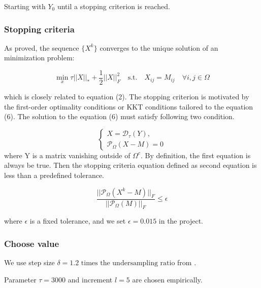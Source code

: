 \documentclass[letter,10pt]{article}
\begin{document}
Starting with $Y_0$ until a stopping criterion is reached.

\subsubsection{Stopping criteria}

As \cite{cai2008} proved, the sequence $\{X^k\}$ converges to the unique solution of an minimization problem:

\begin{equation}
\min_{x} \tau||X||_*+\frac{1}{2}||X||_F^2 \quad \text{s.t.} \quad X_{ij} = M_{ij} \quad \forall i, j\in \Omega
\end{equation}

which is closely related to equation (2).
The stopping criterion is motivated by the first-order optimality conditions or KKT conditions
tailored to the equation (6). The solution to the equation (6) must satisfy following two condition.

\[
\begin{cases} 
X=\mathcal{D}_\tau(Y),\\
\mathcal{P}_\Omega(X-M) = 0 
\end{cases}
\]
where Y is a matrix vanishing outside of $\Omega^c$. By definition, the first equation is always be true. Then the stopping criteria equation defined as second equation is less than a predefined tolerance.

\begin{equation}
\frac{||\mathcal{P}_\Omega(X^k-M)||_F}{||\mathcal{P}_\Omega(M)||_F} \leq \epsilon
\end{equation}

where $\epsilon$ is a fixed tolerance, and we set $\epsilon = 0.015$ in the project. 

\subsubsection{Choose value}

\noindent We use step size $\delta=1.2 \text{ times the undersampling ratio}$ from \cite{cai2008}.

\noindent Parameter $\tau=3000$ and increment $l=5$ are chosen empirically.
\end{document}
